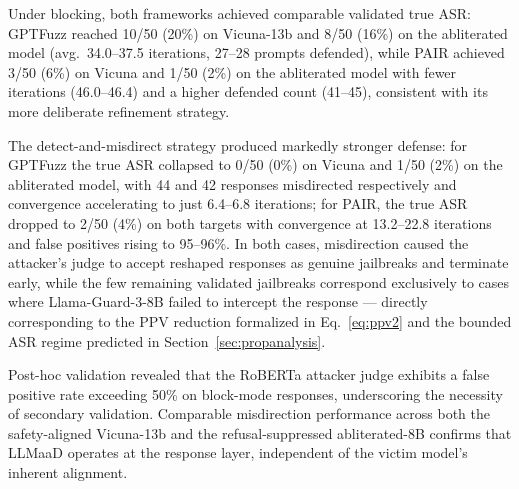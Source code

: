 \begin{table}[t]
    \centering
    \setlength{\tabcolsep}{6pt}
    \renewcommand{\arraystretch}{1.2}
    \caption{PAIR end-to-end results (50 prompts, max 50 iterations, rigorously validated ASR).}
    \label{tab:pair_e2e}
\end{table}

Under blocking, both frameworks achieved comparable validated true ASR: GPTFuzz reached 10/50 (20\%) on Vicuna-13b and 8/50 (16\%) on the abliterated model (avg.\ 34.0--37.5 iterations, 27--28 prompts defended), while PAIR achieved 3/50 (6\%) on Vicuna and 1/50 (2\%) on the abliterated model with fewer iterations (46.0--46.4) and a higher defended count (41--45), consistent with its more deliberate refinement strategy.

The detect-and-misdirect strategy produced markedly stronger defense: for GPTFuzz the true ASR collapsed to 0/50 (0\%) on Vicuna and 1/50 (2\%) on the abliterated model, with 44 and 42 responses misdirected respectively and convergence accelerating to just 6.4--6.8 iterations; for PAIR, the true ASR dropped to 2/50 (4\%) on both targets with convergence at 13.2--22.8 iterations and false positives rising to 95--96\%. In both cases, misdirection caused the attacker's judge to accept reshaped responses as genuine jailbreaks and terminate early, while the few remaining validated jailbreaks correspond exclusively to cases where Llama-Guard-3-8B failed to intercept the response --- directly corresponding to the PPV reduction formalized in Eq.~\eqref{eq:ppv2} and the bounded ASR regime predicted in Section~\ref{sec:propanalysis}.

Post-hoc validation revealed that the RoBERTa attacker judge exhibits a false positive rate exceeding 50\% on block-mode responses, underscoring the necessity of secondary validation. Comparable misdirection performance across both the safety-aligned Vicuna-13b and the refusal-suppressed abliterated-8B confirms that LLMaaD operates at the response layer, independent of the victim model's inherent alignment.
